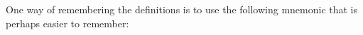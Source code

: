 	\par
      \label{m39408*id79941}One way of remembering the definitions is to use the following mnemonic that is perhaps easier to remember:\par 
      \label{m39408*id79945}
    \setlength\mytablespace{4\tabcolsep}
    \addtolength\mytablespace{3\arrayrulewidth}
    \setlength\mytablewidth{\linewidth}
    \setlength\mytableroom{\mytablewidth}
    \addtolength\mytableroom{-\mytablespace}
    \setlength\myfixedwidth{0pt}
    \setlength\mystarwidth{\mytableroom}
        \addtolength\mystarwidth{-\myfixedwidth}
        \divide{}
